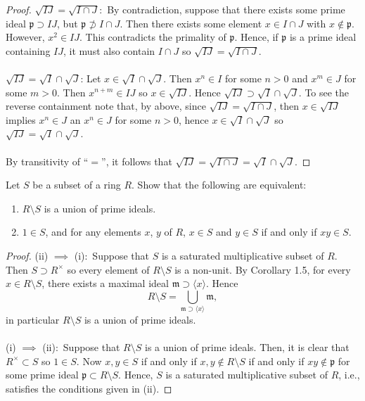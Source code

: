 \begin{proof}
$\sqrt{IJ}=\sqrt{I\cap J}$:~By contradiction, suppose that there
exists some prime ideal $\mathfrak{p}\supset IJ$, but
$\mathfrak{p}\nsupset I\cap J$. Then there exists some element
$x\in I\cap J$ with $x\notin\mathfrak{p}$. However, $x^2\in
IJ$. This contradicts the primality of $\mathfrak{p}$. Hence, if
$\mathfrak{p}$ is a prime ideal containing $IJ$, it must also
contain $I\cap J$ so $\sqrt{IJ}=\sqrt{I\cap J}$.
\\\\
$\sqrt{IJ}=\sqrt{I}\cap\sqrt{J}$: Let
$x\in\sqrt{I}\cap\sqrt{J}$. Then $x^n\in I$ for some $n>0$ and
$x^m\in J$ for some $m>0$. Then $x^{n+m}\in IJ$ so
$x\in\sqrt{IJ}$. Hence $\sqrt{IJ}\supset\sqrt{I}\cap\sqrt{J}$. To
see the reverse containment note that, by above, since
$\sqrt{IJ}=\sqrt{I\cap J}$, then $x\in\sqrt{IJ}$ implies $x^n\in
J$ an $x^n\in J$ for some $n>0$, hence $x\in\sqrt{I}\cap\sqrt{J}$
so $\sqrt{IJ}=\sqrt{I}\cap\sqrt{J}$.
\\\\
By transitivity of ``$=$'', it follows that
$\sqrt{IJ}=\sqrt{I\cap J}=\sqrt{I}\cap\sqrt{J}$.
\end{proof}
\newpage
\begin{problem}
Let $S$ be a subset of a ring $R$. Show that the following are
equivalent:
\begin{enumerate}[noitemsep,label=(\roman*)]
\item $R\setminus S$ is a union of prime ideals.
\item $1\in S$, and for any elements $x$, $y$ of $R$, $x\in S$
  and $y\in S$ if and only if $xy\in S$.
\end{enumerate}
\end{problem}
\begin{proof}
(ii) $\implies$ (i):~Suppose that $S$ is a saturated
multiplicative subset of $R$. Then $S\supset R^\times$ so every
element of $R\setminus S$ is a non-unit. By Corollary 1.5, for
every $x\in R\setminus S$, there exists a maximal ideal
$\mathfrak{m}\supset\langle x\rangle$. Hence
\[
R\setminus S=\bigcup_{\mathfrak{m}\supset\langle x\rangle}\mathfrak{m},
\]
in particular $R\setminus S$ is a union of prime ideals.
\\\\
(i) $\implies$ (ii):~Suppose that $R\setminus S$ is a union of
prime ideals. Then, it is clear that $R^\times \subset S$ so
$1\in S$. Now $x,y\in S$ if and only if $x,y\notin R\setminus S$
if and only if $xy\notin\mathfrak{p}$ for some prime ideal
$\mathfrak{p}\subset R\setminus S$. Hence, $S$ is a saturated
multiplicative subset of $R$, i.e., satisfies the conditions
given in (ii).
\end{proof}
